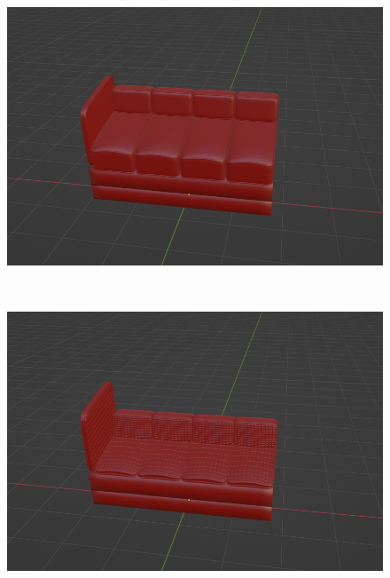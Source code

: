 \begin{figure}[h]
\begin{minipage}[b]{0.48\linewidth}
 \end{minipage}
 \begin{minipage}[b]{0.48\linewidth}
  \centering
  \includegraphics[scale=0.17]{./imgs/sofaParamMean/cushionTicknessMax.png}
 \end{minipage}\\
 \begin{minipage}[b]{0.48\linewidth}
  \centering
  \includegraphics[scale=0.17]{./imgs/sofaParamMean/cushionNosingMin.png}
 \end{minipage}
 \begin{minipage}[b]{0.48\linewidth}
  \centering

\end{minipage}
\end{figure}
